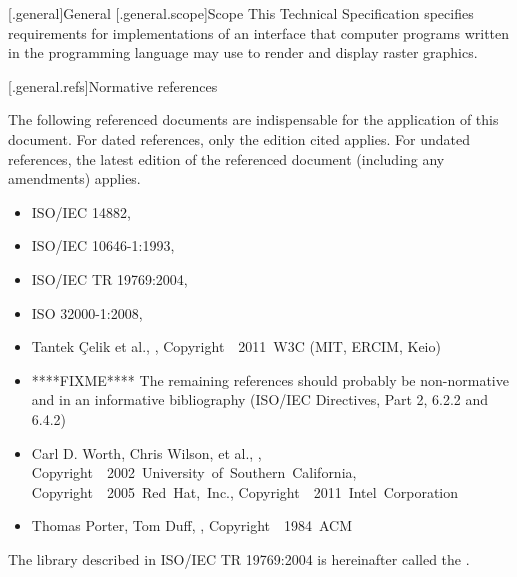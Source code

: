[\iotwod.general]{General}
[\iotwod.general.scope]{Scope}
\pnum
{}%
This Technical Specification specifies requirements for implementations
of an interface that computer programs written in the \Cpp programming
language may use to render and display raster graphics.%

[\iotwod.general.refs]{Normative references}

\pnum
{}%
The following referenced documents are indispensable for the application
of this document. For dated references, only the edition cited applies.
For undated references, the latest edition of the referenced document
(including any amendments) applies.

\begin{itemize}
\item ISO/IEC 14882, 
\item ISO/IEC 10646-1:1993, 
\item ISO/IEC TR 19769:2004, 
\item ISO 32000-1:2008, 
\item Tantek \c{C}elik et al., , 
Copyright~\textcopyright~2011~W3C\textsuperscript{\textregistered} (MIT, ERCIM, 
Keio)
\item ****FIXME**** The remaining references should probably be non-normative 
and in an informative bibliography (ISO/IEC Directives, Part 2, 6.2.2 and 6.4.2)
\item Carl D. Worth, Chris Wilson, et al., , 
Copyright~\textcopyright~2002~University~of~Southern~California, 
Copyright~\textcopyright~2005~Red~Hat,~Inc., 
Copyright~\textcopyright~2011~Intel~Corporation
\item Thomas Porter, Tom Duff, , 
Copyright~\textcopyright~1984~ACM
\end{itemize}

\pnum
The library described in ISO/IEC TR 19769:2004 is hereinafter called the
.

